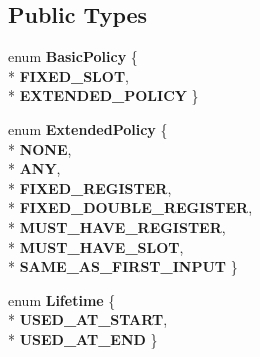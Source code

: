 \subsection*{Public Types}
\begin{DoxyCompactItemize}
\item 
enum {\bfseries Basic\+Policy} \{ \\*
{\bfseries F\+I\+X\+E\+D\+\_\+\+S\+L\+OT}, 
\\*
{\bfseries E\+X\+T\+E\+N\+D\+E\+D\+\_\+\+P\+O\+L\+I\+CY}
 \}\hypertarget{classv8_1_1internal_1_1compiler_1_1_unallocated_operand_a07530491d80058dd15f185f1970014c4}{}\label{classv8_1_1internal_1_1compiler_1_1_unallocated_operand_a07530491d80058dd15f185f1970014c4}

\item 
enum {\bfseries Extended\+Policy} \{ \\*
{\bfseries N\+O\+NE}, 
\\*
{\bfseries A\+NY}, 
\\*
{\bfseries F\+I\+X\+E\+D\+\_\+\+R\+E\+G\+I\+S\+T\+ER}, 
\\*
{\bfseries F\+I\+X\+E\+D\+\_\+\+D\+O\+U\+B\+L\+E\+\_\+\+R\+E\+G\+I\+S\+T\+ER}, 
\\*
{\bfseries M\+U\+S\+T\+\_\+\+H\+A\+V\+E\+\_\+\+R\+E\+G\+I\+S\+T\+ER}, 
\\*
{\bfseries M\+U\+S\+T\+\_\+\+H\+A\+V\+E\+\_\+\+S\+L\+OT}, 
\\*
{\bfseries S\+A\+M\+E\+\_\+\+A\+S\+\_\+\+F\+I\+R\+S\+T\+\_\+\+I\+N\+P\+UT}
 \}\hypertarget{classv8_1_1internal_1_1compiler_1_1_unallocated_operand_a7bdb03b8ffc2cd9db894dc3f3ded2030}{}\label{classv8_1_1internal_1_1compiler_1_1_unallocated_operand_a7bdb03b8ffc2cd9db894dc3f3ded2030}

\item 
enum {\bfseries Lifetime} \{ \\*
{\bfseries U\+S\+E\+D\+\_\+\+A\+T\+\_\+\+S\+T\+A\+RT}, 
\\*
{\bfseries U\+S\+E\+D\+\_\+\+A\+T\+\_\+\+E\+ND}
 \}\hypertarget{classv8_1_1internal_1_1compiler_1_1_unallocated_operand_aa9669901c7a87f6a4218fb4f66412f1f}{}\label{classv8_1_1internal_1_1compiler_1_1_unallocated_operand_aa9669901c7a87f6a4218fb4f66412f1f}

\end{DoxyCompactItemize}
